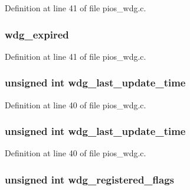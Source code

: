 Definition at line 41 of file pios\-\_\-wdg.\-c.

\hypertarget{group___p_i_o_s___w_d_g_ga50e5c0c02e49b9be478e347b82eb7f2f}{
\subsubsection[{wdg\-\_\-expired}]{ wdg\-\_\-expired}}\label{group___p_i_o_s___w_d_g_ga50e5c0c02e49b9be478e347b82eb7f2f}


Definition at line 41 of file pios\-\_\-wdg.\-c.

\hypertarget{group___p_i_o_s___w_d_g_gaf5d707b03121ce7360f560ebda3fd46b}{
\subsubsection[{wdg\-\_\-last\-\_\-update\-\_\-time}]{\setlength{\rightskip}{0pt plus 5cm}unsigned int wdg\-\_\-last\-\_\-update\-\_\-time}}\label{group___p_i_o_s___w_d_g_gaf5d707b03121ce7360f560ebda3fd46b}


Definition at line 40 of file pios\-\_\-wdg.\-c.

\hypertarget{group___p_i_o_s___w_d_g_gaf5d707b03121ce7360f560ebda3fd46b}{
\subsubsection[{wdg\-\_\-last\-\_\-update\-\_\-time}]{\setlength{\rightskip}{0pt plus 5cm}unsigned int wdg\-\_\-last\-\_\-update\-\_\-time}}\label{group___p_i_o_s___w_d_g_gaf5d707b03121ce7360f560ebda3fd46b}


Definition at line 40 of file pios\-\_\-wdg.\-c.

\hypertarget{group___p_i_o_s___w_d_g_gaab238daf4f2906dc7691f92d408cee6c}{
\subsubsection[{wdg\-\_\-registered\-\_\-flags}]{\setlength{\rightskip}{0pt plus 5cm}unsigned int wdg\-\_\-registered\-\_\-flags}}\label{group___p_i_o_s___w_d_g_gaab238daf4f2906dc7691f92d408cee6c}


